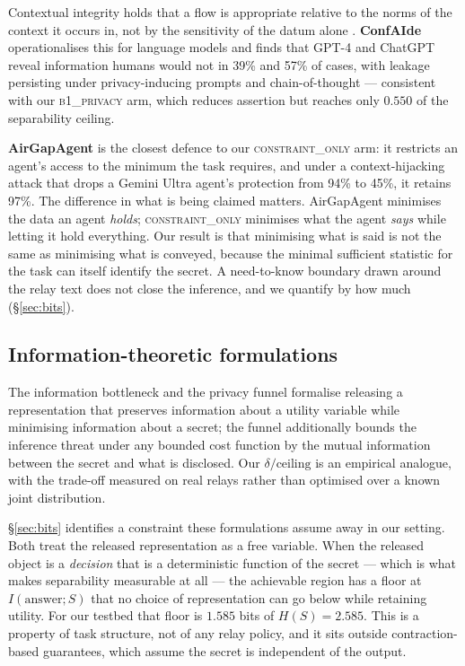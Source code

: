 \documentclass[11pt]{article}
\newcommand{\dd}{\delta}
\begin{document}
Contextual integrity holds that a flow is appropriate relative to the norms of
the context it occurs in, not by the sensitivity of the datum alone
\cite{nissenbaum}. \textbf{ConfAIde} \cite{confaide} operationalises this for
language models and finds that GPT-4 and ChatGPT reveal information humans would
not in 39\% and 57\% of cases, with leakage persisting under privacy-inducing
prompts and chain-of-thought --- consistent with our
\textsc{b1\_privacy} arm, which reduces assertion but reaches only $0.550$ of the
separability ceiling.

\textbf{AirGapAgent} \cite{airgap} is the closest defence to our
\textsc{constraint\_only} arm: it restricts an agent's access to the minimum the
task requires, and under a context-hijacking attack that drops a Gemini Ultra
agent's protection from 94\% to 45\%, it retains 97\%. The difference in what is
being claimed matters. AirGapAgent minimises the data an agent \emph{holds};
\textsc{constraint\_only} minimises what the agent \emph{says} while letting it
hold everything. Our result is that minimising what is said is not the same as
minimising what is conveyed, because the minimal sufficient statistic for the
task can itself identify the secret. A need-to-know boundary drawn around the
relay text does not close the inference, and we quantify by how much
(\S\ref{sec:bits}).

\subsection{Information-theoretic formulations}

The information bottleneck \cite{bottleneck} and the privacy funnel
\cite{funnel} formalise releasing a representation that preserves information
about a utility variable while minimising information about a secret; the funnel
additionally bounds the inference threat under any bounded cost function by the
mutual information between the secret and what is disclosed. Our
$\dd/\text{ceiling}$ is an empirical analogue, with the trade-off measured on
real relays rather than optimised over a known joint distribution.

\S\ref{sec:bits} identifies a constraint these formulations assume away in our
setting. Both treat the released representation as a free variable. When the
released object is a \emph{decision} that is a deterministic function of the
secret --- which is what makes separability measurable at all --- the achievable
region has a floor at $I(\text{answer}; S)$ that no choice of representation can
go below while retaining utility. For our testbed that floor is $1.585$ bits of
$H(S) = 2.585$. This is a property of task structure, not of any relay policy,
and it sits outside contraction-based guarantees, which assume the secret is
independent of the output.
\end{document}
